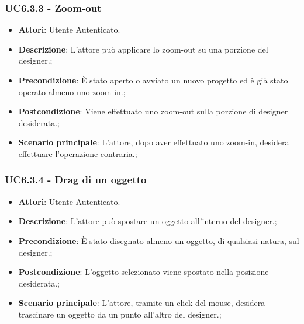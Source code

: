 \subsubsection{UC6.3.3 - Zoom-out} 
\label{sssec:UC6.3.3} 
\begin{itemize} 
\item \textbf{Attori}: Utente Autenticato.
\item \textbf{Descrizione}: L'attore può applicare lo zoom-out su una porzione del designer.;
\item \textbf{Precondizione}: È stato aperto o avviato un nuovo progetto ed è già stato operato almeno uno zoom-in.;
\item \textbf{Postcondizione}: Viene effettuato uno zoom-out sulla porzione di designer desiderata.;
\item \textbf{Scenario principale}: L'attore, dopo aver effettuato uno zoom-in, desidera effettuare l'operazione contraria.;\end{itemize} 
\subsubsection{UC6.3.4 - Drag di un oggetto} 
\label{sssec:UC6.3.4} 
\begin{itemize} 
\item \textbf{Attori}: Utente Autenticato.
\item \textbf{Descrizione}: L'attore può spostare un oggetto all'interno del designer.;
\item \textbf{Precondizione}: È stato disegnato almeno un oggetto, di qualsiasi natura, sul designer.;
\item \textbf{Postcondizione}: L'oggetto selezionato viene spostato nella posizione desiderata.;
\item \textbf{Scenario principale}: L'attore, tramite un click del mouse, desidera trascinare un oggetto da un punto all'altro del designer.;\end{itemize} 
